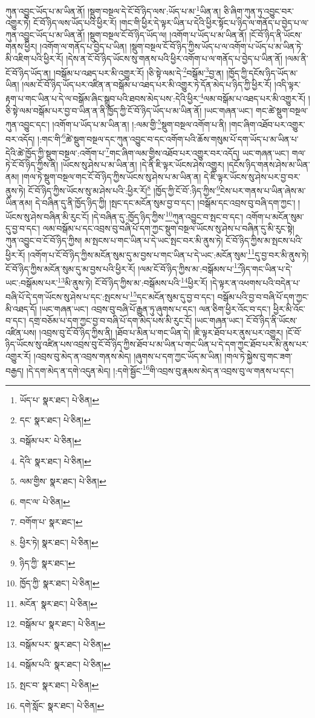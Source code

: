ཀུན་འབྱུང་ཡོད་པ་མ་ཡིན་ནོ། །སྡུག་བསྔལ་དེ་ངོ་བོ་ཉིད་ལས་:ཡོད་པ་མ་\footnote{ཡོད་པ་  སྣར་ཐང་།  པེ་ཅིན། }ཡིན་ན། ཅི་ཞིག་ཀུན་ཏུ་འབྱུང་བར་འགྱུར་ཏེ། ངོ་བོ་ཉིད་ལས་ཡོད་པའི་ཕྱིར་རོ། །གང་གི་ཕྱིར་དེ་ལྟར་ཡིན་པ་དེའི་ཕྱིར་སྟོང་པ་ཉིད་ལ་གནོད་པ་བྱེད་པ་ལ་ཀུན་འབྱུང་ཡོད་པ་མ་ཡིན་ནོ། །སྡུག་བསྔལ་ངོ་བོ་ཉིད་ཡོད་ལ། །འགོག་པ་ཡོད་པ་མ་ཡིན་ནོ། །ངོ་བོ་ཉིད་ནི་ཡོངས་གནས་ཕྱིར། །འགོག་ལ་གནོད་པ་བྱེད་པ་ཡིན། །སྡུག་བསྔལ་ངོ་བོ་ཉིད་ཀྱིས་ཡོད་པ་ལ་འགོག་པ་ཡོད་པ་མ་ཡིན་ཏེ་མི་འཇིག་པའི་ཕྱིར་རོ། །དེས་ན་ངོ་བོ་ཉིད་ཡོངས་སུ་གནས་པའི་ཕྱིར་འགོག་པ་ལ་གནོད་པ་བྱེད་པ་ཡིན་ནོ། །ལམ་ནི་ངོ་བོ་ཉིད་ཡོད་ན། །བསྒོམ་པ་འཐད་པར་མི་འགྱུར་རོ། །ཅི་སྟེ་ལམ་དེ་\footnote{དང་  སྣར་ཐང་།  པེ་ཅིན། }བསྒོམ་\footnote{བསྒོམ་པར་  པེ་ཅིན། }བྱ་ན། །ཁྱོད་ཀྱི་དངོས་ཉིད་ཡོད་མ་ཡིན། །ལམ་ངོ་བོ་ཉིད་ཡོད་པར་འཛིན་ན་བསྒོམ་པ་འཐད་པར་མི་འགྱུར་ཏེ་དོན་མེད་པ་ཉིད་ཀྱི་ཕྱིར་རོ། །འདི་ལྟར་རྟག་པ་གང་ཡིན་པ་དེ་ལ་བསྒོམ་ཞིང་སྒྲུབ་པའི་ཐབས་མེད་པས་:དེའི་ཕྱིར་\footnote{དེའི་  སྣར་ཐང་།  པེ་ཅིན། }ལམ་བསྒོམ་པ་འཐད་པར་མི་འགྱུར་རོ། །ཅི་སྟེ་ལམ་བསྒོམ་པར་བྱ་བ་ཡིན་ན་ནི་ཁྱོད་ཀྱི་ངོ་བོ་ཉིད་ཡོད་པ་མ་ཡིན་ནོ། །ཡང་གཞན་ཡང་། གང་ཚེ་སྡུག་བསྔལ་ཀུན་འབྱུང་དང་། །འགོག་པ་ཡོད་པ་མ་ཡིན་ན། །:ལམ་གྱི་\footnote{ལམ་གྱིས་  སྣར་ཐང་།  པེ་ཅིན། }སྡུག་བསྔལ་འགོག་པ་ནི། །གང་ཞིག་འཐོབ་པར་འགྱུར་བར་འདོད། །:གང་གི་\footnote{གང་ལ་  པེ་ཅིན། }ཚེ་སྡུག་བསྔལ་དང་ཀུན་འབྱུང་བ་དང་འགོག་པའི་ཆོས་གསུམ་པོ་དག་ཡོད་པ་མ་ཡིན་པ་དེའི་ཚེ་ཁྱོད་ཀྱི་སྡུག་བསྔལ་:འགོག་པ་\footnote{བགོག་པ་  སྣར་ཐང་། }གང་ཞིག་ལམ་གྱིས་འཐོབ་པར་འགྱུར་བར་འདོད། ཡང་གཞན་ཡང་། གལ་ཏེ་ངོ་བོ་ཉིད་ཀྱིས་ནི། །ཡོངས་སུ་ཤེས་པ་མ་ཡིན་ན། །དེ་ནི་ཇི་ལྟར་ཡོངས་ཤེས་འགྱུར། །དངོས་ཉིད་གནས་ཤེས་མ་ཡིན་ནམ། །གལ་ཏེ་སྡུག་བསྔལ་གང་ངོ་བོ་ཉིད་ཀྱིས་ཡོངས་སུ་ཤེས་པ་མ་ཡིན་ན། དེ་ཇི་ལྟར་ཡོངས་སུ་ཤེས་པར་བྱ་བར་ནུས་ཏེ། ངོ་བོ་ཉིད་ཀྱིས་ཡོངས་སུ་མ་ཤེས་པའི་:ཕྱིར་རོ།\footnote{ཕྱིར་ཏེ།  སྣར་ཐང་།  པེ་ཅིན། } །ཁྱོད་ཀྱི་ངོ་བོ་:ཉིད་ཀྱིས་\footnote{ཉིད་ཀྱི་  སྣར་ཐང་། }ངེས་པར་གནས་པ་ཡིན་ཞེས་མ་ཡིན་ནམ། དེ་བཞིན་དུ་ནི་ཁྱོད་ཉིད་ཀྱི། །སྤང་དང་མངོན་སུམ་བྱ་བ་དང་། །བསྒོམ་དང་འབྲས་བུ་བཞི་དག་ཀྱང་། །ཡོངས་སུ་ཤེས་བཞིན་མི་རུང་ངོ། །དེ་བཞིན་དུ་:ཁྱོད་ཉིད་ཀྱིས་\footnote{ཁྱོད་ཀྱི་  སྣར་ཐང་།  པེ་ཅིན། }ཀུན་འབྱུང་བ་སྤང་བ་དང་། འགོག་པ་མངོན་སུམ་དུ་བྱ་བ་དང་། ལམ་བསྒོམ་པ་དང་འབྲས་བུ་བཞི་པོ་དག་ཀྱང་སྡུག་བསྔལ་ཡོངས་སུ་ཤེས་པ་བཞིན་དུ་མི་རུང་སྟེ། ཀུན་འབྱུང་བ་ངོ་བོ་ཉིད་ཀྱིས། མ་སྤངས་པ་གང་ཡིན་པ་དེ་ཡང་སྤང་བར་མི་ནུས་ཏེ། ངོ་བོ་ཉིད་ཀྱིས་མ་སྤངས་པའི་ཕྱིར་རོ། །འགོག་པ་ངོ་བོ་ཉིད་ཀྱིས་མངོན་སུམ་དུ་མ་བྱས་པ་གང་ཡིན་པ་དེ་ཡང་:མངོན་སུམ་\footnote{མངོན་  སྣར་ཐང་།  པེ་ཅིན། }དུ་བྱ་བར་མི་ནུས་ཏེ། ངོ་བོ་ཉིད་ཀྱིས་མངོན་སུམ་དུ་མ་བྱས་པའི་ཕྱིར་རོ། །ལམ་ངོ་བོ་ཉིད་ཀྱིས་མ་:བསྒོམས་པ་\footnote{བསྒོམ་པ་  སྣར་ཐང་།  པེ་ཅིན། }ཉིད་གང་ཡིན་པ་དེ་ཡང་:བསྒོམས་པར་\footnote{བསྒོམ་པར་  སྣར་ཐང་།  པེ་ཅིན། }མི་ནུས་ཏེ། ངོ་བོ་ཉིད་ཀྱིས་མ་:བསྒོམས་པའི་\footnote{བསྒོམ་པའི་  སྣར་ཐང་།  པེ་ཅིན། }ཕྱིར་རོ། །དེ་ལྟར་ན་འཕགས་པའི་བདེན་པ་བཞི་པོ་དེ་དག་ཡོངས་སུ་ཤེས་པ་དང་:སྤངས་པ་\footnote{སྤང་བ་  སྣར་ཐང་།  པེ་ཅིན། }དང་མངོན་སུམ་དུ་བྱ་བ་དང་། བསྒོམ་པའི་བྱ་བ་བཞི་པོ་དག་ཀྱང་མི་འཐད་དོ། །ཡང་གཞན་ཡང་། འབྲས་བུ་བཞི་པོ་རྒྱུན་ཏུ་ཞུགས་པ་དང་། ལན་ཅིག་ཕྱིར་འོང་བ་དང་། ཕྱིར་མི་འོང་བ་དང་། དགྲ་བཅོམ་པ་དག་ཀྱང་བྱ་བ་བཞི་པོ་དག་མེད་པས་མི་རུང་ངོ། །ཡང་གཞན་ཡང་། ངོ་བོ་ཉིད་ནི་ཡོངས་འཛིན་པས། །འབྲས་བུ་ངོ་བོ་ཉིད་ཀྱིས་ནི། །ཐོབ་པ་མིན་པ་གང་ཡིན་དེ། །ཇི་ལྟར་ཐོབ་པར་ནུས་པར་འགྱུར། །ངོ་བོ་ཉིད་ཡོངས་སུ་འཛིན་པས་འབྲས་བུ་ངོ་བོ་ཉིད་ཀྱིས་ཐོབ་པ་མ་ཡིན་པ་གང་ཡིན་པ་དེ་དག་ཀྱང་ཐོབ་པར་མི་ནུས་པར་འགྱུར་རོ། །འབྲས་བུ་མེད་ན་འབྲས་གནས་མེད། །ཞུགས་པ་དག་ཀྱང་ཡོད་མ་ཡིན། །གལ་ཏེ་སྐྱེས་བུ་གང་ཟག་བརྒྱད། །དེ་དག་མེད་ན་དགེ་འདུན་མེད། །:དགེ་སྦྱོང་\footnote{དགེ་སློང་  སྣར་ཐང་།  པེ་ཅིན། }གི་འབྲས་བུ་རྣམས་མེད་ན་འབྲས་བུ་ལ་གནས་པ་དང་། 